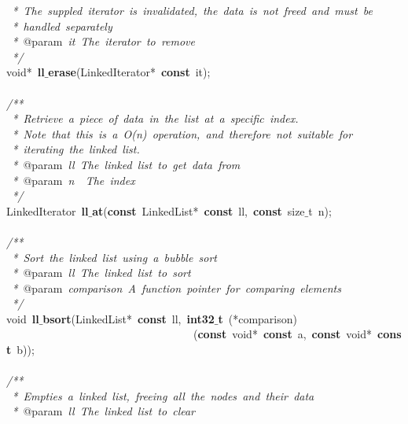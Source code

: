 \documentclass{article}
\begin{document}
\mbox{}\textit{\ *\ The\ suppled\ iterator\ is\ invalidated,\ the\ data\ is\ not\ freed\ and\ must\ be} \\
\mbox{}\textit{\ *\ handled\ separately} \\
\mbox{}\textit{\ *\ }@param\textit{\ it\ The\ iterator\ to\ remove} \\
\mbox{}\textit{\ */} \\
\mbox{}void*\ \textbf{ll$\_$erase}(LinkedIterator*\ \textbf{const}\ it); \\
\mbox{} \\
\mbox{}\textit{/**} \\
\mbox{}\textit{\ *\ Retrieve\ a\ piece\ of\ data\ in\ the\ list\ at\ a\ specific\ index.} \\
\mbox{}\textit{\ *\ Note\ that\ this\ is\ a\ O(n)\ operation,\ and\ therefore\ not\ suitable\ for} \\
\mbox{}\textit{\ *\ iterating\ the\ linked\ list.} \\
\mbox{}\textit{\ *\ }@param\textit{\ ll\ The\ linked\ list\ to\ get\ data\ from} \\
\mbox{}\textit{\ *\ }@param\textit{\ n\ \ The\ index} \\
\mbox{}\textit{\ */} \\
\mbox{}LinkedIterator\ \textbf{ll$\_$at}(\textbf{const}\ LinkedList*\ \textbf{const}\ ll,\ \textbf{const}\ size$\_$t\ n); \\
\mbox{} \\
\mbox{}\textit{/**} \\
\mbox{}\textit{\ *\ Sort\ the\ linked\ list\ using\ a\ bubble\ sort} \\
\mbox{}\textit{\ *\ }@param\textit{\ ll\ The\ linked\ list\ to\ sort} \\
\mbox{}\textit{\ *\ }@param\textit{\ comparison\ A\ function\ pointer\ for\ comparing\ elements} \\
\mbox{}\textit{\ */} \\
\mbox{}void\ \textbf{ll$\_$bsort}(LinkedList*\ \textbf{const}\ ll,\ \textbf{int32$\_$t}\ (*comparison) \\
\mbox{}\ \ \ \ \ \ \ \ \ \ \ \ \ \ \ \ \ \ \ \ \ \ \ \ \ \ \ \ \ \ \ \ \ \ (\textbf{const}\ void*\ \textbf{const}\ a,\ \textbf{const}\ void*\ \textbf{const}\ b)); \\
\mbox{} \\
\mbox{}\textit{/**} \\
\mbox{}\textit{\ *\ Empties\ a\ linked\ list,\ freeing\ all\ the\ nodes\ and\ their\ data} \\
\mbox{}\textit{\ *\ }@param\textit{\ ll\ The\ linked\ list\ to\ clear} \\
\end{document}
